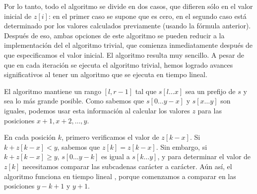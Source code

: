 Por lo tanto, todo el algoritmo se divide en dos casos, que difieren sólo en el valor inicial de $z[i]$: en el primer caso se supone que es cero, en el
segundo caso está determinado por los valores calculados previamente (usando la fórmula anterior). Después de eso, ambas opciones de este
algoritmo se pueden reducir a la implementación del el algoritmo trivial, que comienza inmediatamente después de que especificamos el valor
inicial. El algoritmo resulta muy sencillo. A pesar de que en cada iteración se ejecuta el algoritmo trivial, hemos logrado avances significativos al tener un
algoritmo que se ejecuta en tiempo lineal.

El algoritmo mantiene un rango $[l, r-1]$ tal que $s[l \dots x]$ sea un prefijo de $s$ y sea lo más grande posible. Como sabemos que $s[0 \dots y-x]$ y $s[x \dots y]$ son iguales, podemos usar esta información al calcular los valores $z$ para las posiciones $x+1, x+2, \dots, y$.

En cada posición $k$, primero verificamos el valor de $z[k-x]$. Si $k+z[k-x]<y$, sabemos que $z[k] = z[k-x]$. Sin embargo, si $k+z[k-x] \ge y$, $s[0 \dots y-k]$ es igual a $s[k \dots y]$, y para determinar el valor de $z[k]$ necesitamos comparar las subcadenas carácter a carácter. Aún así, el algoritmo funciona en tiempo lineal , porque comenzamos a comparar en las posiciones $y-k+1$ y $y+1$.